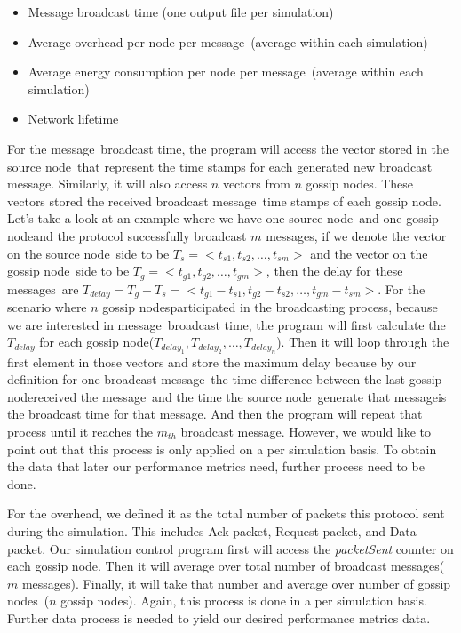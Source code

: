 \documentclass[onehalf,11pt]{beavtex}
\newcommand{\msgs}{messages}
\newcommand{\msg}{message}
\newcommand{\gn}{gossip node}
\newcommand{\gns}{gossip nodes}
\newcommand{\sn}{source node}
\begin{document}
\begin{itemize}
	\item Message broadcast time (one output file per simulation)
	\item Average overhead per node per \msg ~(average within each simulation)
	\item Average energy consumption per node per \msg ~(average within each simulation)
	\item Network lifetime
\end{itemize}

For the \msg ~broadcast time, the program will access the vector stored in the \sn ~that represent the time stamps for each generated new broadcast \msg. Similarly, it will also access $n$ vectors from $n$ \gns. These vectors stored the received broadcast \msg ~time stamps of each \gn. Let's take a look at an example where we have one \sn ~and one \gn and the protocol successfully broadcast $m$ \msgs, if we denote the vector on the \sn ~side to be $T_s=<t_{s1}, t_{s2}, \ldots, t_{sm}>$ and the vector on the \gn ~side to be $T_g=<t_{g1}, t_{g2}, \ldots, t_{gm}>$, then the delay for these \msgs ~are $T_{delay}= T_g - T_s = <t_{g1}-t_{s1}, t_{g2}-t_{s2}, \ldots, t_{gm}-t_{sm}>$. For the scenario where $n$ \gns participated in the broadcasting process, because we are interested in \msg ~broadcast time, the program will first calculate the $T_{delay}$ for each \gn ($T_{delay_1},T_{delay_2},\ldots,T_{delay_n} $). Then it will loop through the first element in those vectors and store the maximum delay because by our definition for one broadcast \msg ~the time difference between the last \gn received the \msg ~and the time the \sn ~generate that \msg is the broadcast time for that \msg. And then the program will repeat that process until it reaches the $m_{th}$ broadcast \msg. However, we would like to point out that this process is only applied on a per simulation basis. To obtain the data that later our performance metrics need, further process need to be done.

For the overhead, we defined it as the total number of packets this protocol sent during the simulation. This includes Ack packet, Request packet, and Data packet. Our simulation control program first will access the \emph{packetSent} counter on each \gn. Then it will average over total number of broadcast \msgs ($m$ \msgs). Finally, it will take that number and average over number of \gns ~($n$ gossip nodes). Again, this process is done in a per simulation basis. Further data process is needed to yield our desired performance metrics data.
\end{document}
